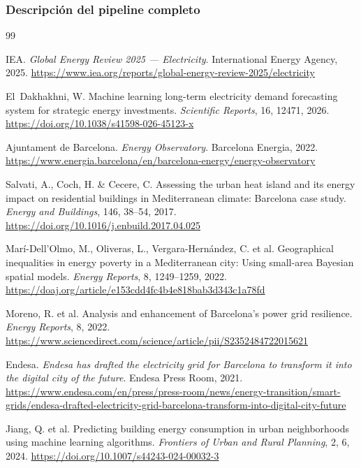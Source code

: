 \documentclass[12pt, a4paper]{article}
\begin{document}
\subsubsection{Descripción del pipeline completo}

\newpage
\begin{thebibliography}{99}

IEA. \textit{Global Energy Review 2025 --- Electricity}. International Energy Agency, 2025.
\url{https://www.iea.org/reports/global-energy-review-2025/electricity}

El~Dakhakhni, W. Machine learning long-term electricity demand forecasting system for strategic energy investments. \textit{Scientific Reports}, 16, 12471, 2026.
\url{https://doi.org/10.1038/s41598-026-45123-x}

Ajuntament de Barcelona. \textit{Energy Observatory}. Barcelona Energia, 2022.
\url{https://www.energia.barcelona/en/barcelona-energy/energy-observatory}

Salvati, A., Coch, H. \& Cecere, C. Assessing the urban heat island and its energy impact on residential buildings in Mediterranean climate: Barcelona case study. \textit{Energy and Buildings}, 146, 38--54, 2017.
\url{https://doi.org/10.1016/j.enbuild.2017.04.025}

Marí-Dell'Olmo, M., Oliveras, L., Vergara-Hernández, C. et al. Geographical inequalities in energy poverty in a Mediterranean city: Using small-area Bayesian spatial models. \textit{Energy Reports}, 8, 1249--1259, 2022.
\url{https://doaj.org/article/e153cdd4fc4b4e818bab3d343c1a78fd}

Moreno, R. et al. Analysis and enhancement of Barcelona's power grid resilience. \textit{Energy Reports}, 8, 2022.
\url{https://www.sciencedirect.com/science/article/pii/S2352484722015621}

Endesa. \textit{Endesa has drafted the electricity grid for Barcelona to transform it into the digital city of the future}. Endesa Press Room, 2021.
\url{https://www.endesa.com/en/press/press-room/news/energy-transition/smart-grids/endesa-drafted-electricity-grid-barcelona-transform-into-digital-city-future}

Jiang, Q. et al. Predicting building energy consumption in urban neighborhoods using machine learning algorithms. \textit{Frontiers of Urban and Rural Planning}, 2, 6, 2024.
\url{https://doi.org/10.1007/s44243-024-00032-3}


\end{thebibliography}
\end{document}
